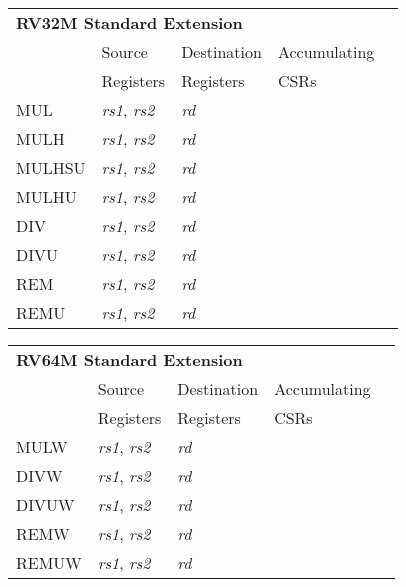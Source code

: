\begin{tabular}{p{3cm}|p{25mm}|p{3cm}|p{4cm}|p{4cm}}
  \multicolumn{4}{l}{\bf RV32M Standard Extension} \\
  \cline{2-4}
   & Source    & Destination & Accumulating \\
   & Registers & Registers   & CSRs \\
  \cline{2-4}
   MUL & {\em rs1}, {\em rs2} & {\em rd} &   & \\
   \cline{2-4}
   MULH & {\em rs1}, {\em rs2} & {\em rd} &   & \\
   \cline{2-4}
   MULHSU & {\em rs1}, {\em rs2} & {\em rd} &   & \\
   \cline{2-4}
   MULHU & {\em rs1}, {\em rs2} & {\em rd} &   & \\
   \cline{2-4}
   DIV & {\em rs1}, {\em rs2} & {\em rd} &   & \\
   \cline{2-4}
   DIVU & {\em rs1}, {\em rs2} & {\em rd} &   & \\
   \cline{2-4}
   REM & {\em rs1}, {\em rs2} & {\em rd} &   & \\
   \cline{2-4}
   REMU & {\em rs1}, {\em rs2} & {\em rd} &   & \\
   \cline{2-4}
\end{tabular}

\begin{tabular}{p{3cm}|p{25mm}|p{3cm}|p{4cm}|p{4cm}}
  \multicolumn{4}{l}{\bf RV64M Standard Extension} \\
  \cline{2-4}
   & Source    & Destination & Accumulating \\
   & Registers & Registers   & CSRs \\
  \cline{2-4}
   MULW & {\em rs1}, {\em rs2} & {\em rd} &   & \\
   \cline{2-4}
   DIVW & {\em rs1}, {\em rs2} & {\em rd} &   & \\
   \cline{2-4}
   DIVUW & {\em rs1}, {\em rs2} & {\em rd} &   & \\
   \cline{2-4}
   REMW & {\em rs1}, {\em rs2} & {\em rd} &   & \\
   \cline{2-4}
   REMUW & {\em rs1}, {\em rs2} & {\em rd} &   & \\
   \cline{2-4}
\end{tabular}

